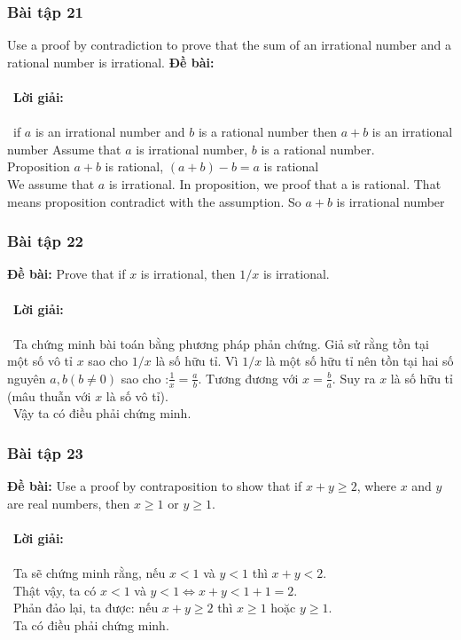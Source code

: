 \documentclass[a4paper]{article}
\begin{document}
\clearpage
\subsubsection{Bài tập 21} Use a proof by contradiction to prove that the sum of an irrational number and a rational number is
irrational.
\textbf{Đề bài:} 
\\\ \\\
\textbf{Lời giải:} \\\ \\\
if $a$ is an irrational number and $b$ is a rational number then $a+b$ is an irrational number
		Assume that $a$ is irrational number, $b$ is a rational number.\\
		Proposition $a+b$ is rational, $(a+b)-b=a$ is rational\\
		We assume that $a$ is irrational. In proposition, we proof that a is rational. That means proposition contradict with the assumption. So $a+b$ is irrational number\\
\clearpage
\subsubsection{Bài tập 22}
\textbf{Đề bài: }Prove that if $x$ is irrational, then $1/x$ is irrational. \\\ \\\
\textbf{Lời giải:} \\\ \\\
Ta chứng minh bài toán bằng phương pháp phản chứng. Giả sử rằng tồn tại một số vô tỉ $x$ sao cho $1/x$ là số hữu tỉ. Vì $1/x$ là một số hữu tỉ nên tồn tại hai số nguyên $a,b (b \neq 0)$ sao cho :$\frac{1}{x} = \frac{a}{b}.$ Tương đương với $x = \frac{b}{a}$. Suy ra $x$ là số hữu tỉ (mâu thuẫn với $x$ là số vô tỉ). \\\
Vậy ta có điều phải chứng minh.
\clearpage
\subsubsection{Bài tập 23}
\textbf{Đề bài: } Use a proof by contraposition to show that if $x + y \geq 2$, where $x$ and $y$ are real numbers, then $x \geq 1$ or $y \geq 1$.\\\ \\\
\textbf{Lời giải:} \\\ \\\
Ta sẽ chứng minh rằng, nếu $x < 1$ và $y < 1$ thì $x+y< 2$. \\\
Thật vậy, ta có $x < 1$ và $y < 1 \Leftrightarrow x+y < 1+1 = 2$. \\\
Phản đảo lại, ta được: nếu $x+y \geq 2$ thì $x \geq 1$ hoặc $y \geq 1$. \\\
Ta có điều phải chứng minh.
\end{document}
